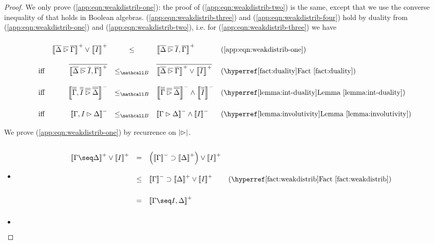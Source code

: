 \begin{proof}
  We only prove (\ref{app:eqn:weakdistrib-one}): the proof of
  (\ref{app:eqn:weakdistrib-two}) is the same, except that we use the converse
  inequality of  that holds in Boolean algebras.
  (\ref{app:eqn:weakdistrib-three}) and (\ref{app:eqn:weakdistrib-four}) hold by duality
  from (\ref{app:eqn:weakdistrib-one}) and (\ref{app:eqn:weakdistrib-two}), i.e. for
  (\ref{app:eqn:weakdistrib-three}) we have
  $$
  \def\arraystretch{2.5}
  \begin{array}{rrcll}
               & \psint{\soldual{\Delta} \mathbin{\soldual{\J}} \soldual{\Gamma}} \lor \psint{\soldual{I}} &\sement& \psint{\soldual{\Delta} \mathbin{\soldual{\J}} \soldual{I}, \soldual{\Gamma}} &\text{(\ref{app:eqn:weakdistrib-one})} \\
    \text{iff} & \soldual{\psint{\soldual{\Delta} \mathbin{\soldual{\J}} \soldual{I}, \soldual{\Gamma}}} &\sementB& \soldual{\psint{\soldual{\Delta} \mathbin{\soldual{\J}} \soldual{\Gamma}} \lor \psint{\soldual{I}}} &\text{(\reffact{duality})} \\
    \text{iff} & \nsint{\soldual{\soldual{\Gamma}}, \soldual{\soldual{I}} \mathbin{\soldual{\mathbin{\soldual{\J}}}} \soldual{\soldual{\Delta}}} &\sementB& \nsint{\soldual{\soldual{\Gamma}} \mathbin{\soldual{\mathbin{\soldual{\J}}}} \soldual{\soldual{\Delta}}} \land \nsint{\soldual{\soldual{I}}} &\text{(\reflemma{int-duality})} \\
    \text{iff} & \nsint{\Gamma, I \mathbin{\J} \Delta} &\sementB& \nsint{\Gamma \mathbin{\J} \Delta} \land \nsint{I} &\text{(\reflemma{involutivity})} \\
  \end{array}
  $$
  We prove (\ref{app:eqn:weakdistrib-one}) by recurrence on $\bradepth{\J}$.
  \begin{itemize}
    \item[\bcase]
    $$
    \begin{array}{rcll}
      \psint{\Gamma \seq \Delta} \lor \psint{I}
      &=& \left(\nsint{\Gamma} \limp \psint{\Delta}\right) \lor \psint{I} & \\
      &\sement& \nsint{\Gamma} \limp \psint{\Delta} \lor \psint{I} &\text{(\reffact{weakdistrib})} \\
      &=& \psint{\Gamma \seq I, \Delta} & \\
    \end{array}
    $$
    \item[\rcase]
    $$
    \begin{array}{rcll}

\end{array}$$
\end{itemize}
\end{proof}
